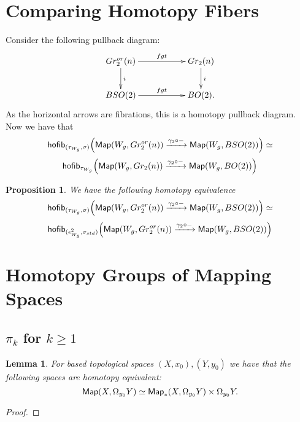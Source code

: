 \documentclass{amsart}
\newtheorem{prop}[theorem]{Proposition}
\newtheorem{lemma}[theorem]{Lemma}
\theoremstyle{definition}
\theoremstyle{remark}
\newcommand{\xra}{\xrightarrow}
\begin{document}
\section{Comparing Homotopy Fibers}
Consider the following pullback diagram:
$$
\xymatrix{
Gr_{2}^{or}(n) \ar[rr]^-{fgt} \ar[d]^-{i}
&&
Gr_{2}(n) \ar[d]^-{i}
\\
BSO(2) \ar[rr]^-{fgt} 
&&
BO(2).
}$$
As the horizontal arrows are fibrations, this is a homotopy pullback diagram.
Now we have that 
$$
{\sf hofib}_{(\tau_{W_{g}}, \sigma)}\Big({\sf Map}(W_{g}, Gr_{2}^{or}(n)) \xra{\gamma_{2} \circ - } {\sf Map}(W_{g}, BSO(2))\Big) \simeq
$$
$$ 
{\sf hofib}_{\tau_{W_{g}}}\Big({\sf Map}(W_{g}, Gr_{2}(n)) \xra{\gamma_{2} \circ - } {\sf Map}(W_{g}, BO(2))\Big)
$$
\begin{prop}
We have the following homotopy equivalence
$${\sf hofib}_{(\tau_{W_{g}}, \sigma)}\Big({\sf Map}(W_{g}, Gr_{2}^{or}(n)) \xra{\gamma_{2} \circ - } {\sf Map}(W_{g}, BSO(2))\Big) \simeq$$
$$
{\sf hofib}_{(\epsilon^{2}_{W_{g}}, \sigma_{std})}\Big({\sf Map}(W_{g}, Gr_{2}^{or}(n)) \xra{\gamma_{2} \circ - } {\sf Map}(W_{g}, BSO(2))\Big)
$$
\end{prop}

\section{Homotopy Groups of Mapping Spaces}
\subsection{$\pi_{k}$ for $k \geq 1$}
\begin{lemma} \label{l2}
For based topological spaces $(X, x_{0}), (Y, y_{0})$ we have that the following spaces are homotopy equivalent:
$${\sf Map}(X, \Omega_{y_{0}}Y) \simeq {\sf Map}_{\ast}(X, \Omega_{y_{0}}Y) \times \Omega_{y_{0}}Y.$$
\end{lemma}
\begin{proof}

\end{proof}
\end{document}

